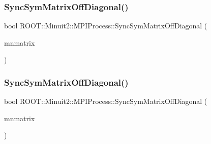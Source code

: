 \subsubsection{\texorpdfstring{SyncSymMatrixOffDiagonal()}{SyncSymMatrixOffDiagonal()}\hspace{0.1cm}{\footnotesize\ttfamily [2/3]}}
{\footnotesize\ttfamily bool R\+O\+O\+T\+::\+Minuit2\+::\+M\+P\+I\+Process\+::\+Sync\+Sym\+Matrix\+Off\+Diagonal (\begin{DoxyParamCaption}\item[{\mbox{\hyperlink{namespaceROOT_1_1Minuit2_a9e74ad97f5537a2e80e52b04d98ecc6e}{R\+O\+O\+T\+::\+Minuit2\+::\+Mn\+Algebraic\+Sym\+Matrix}} \&}]{mnmatrix }\end{DoxyParamCaption})}

\mbox{\label{classROOT_1_1Minuit2_1_1MPIProcess_ac00f83396ec6b7985dad640981a07657}} 
\subsubsection{\texorpdfstring{SyncSymMatrixOffDiagonal()}{SyncSymMatrixOffDiagonal()}\hspace{0.1cm}{\footnotesize\ttfamily [3/3]}}
{\footnotesize\ttfamily bool R\+O\+O\+T\+::\+Minuit2\+::\+M\+P\+I\+Process\+::\+Sync\+Sym\+Matrix\+Off\+Diagonal (\begin{DoxyParamCaption}\item[{\mbox{\hyperlink{namespaceROOT_1_1Minuit2_a9e74ad97f5537a2e80e52b04d98ecc6e}{R\+O\+O\+T\+::\+Minuit2\+::\+Mn\+Algebraic\+Sym\+Matrix}} \&}]{mnmatrix }\end{DoxyParamCaption})}

